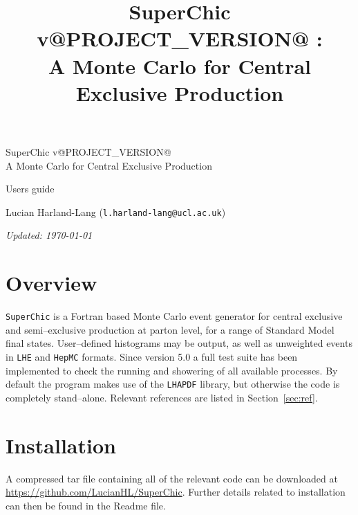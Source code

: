 \documentclass[12pt]{article}
\title{SuperChic v@PROJECT_VERSION@ : \\ \vspace{0.5cm}A Monte Carlo for Central Exclusive Production}
\begin{document}
\begin{titlepage}
\begin{center}

{\huge SuperChic v@PROJECT_VERSION@} \\ \vspace{0.5cm} {\Large A Monte Carlo for Central Exclusive Production}

\vspace{3cm}

{\huge Users guide}

\vspace{3cm}

\large{ Lucian Harland-Lang (\texttt{l.harland-lang@ucl.ac.uk})}

\vspace{3cm}
{\small \emph{Updated: \today}}

\end{center}
\end{titlepage}

\clearpage

\tableofcontents

\clearpage

\section{Overview}

\texttt{SuperChic} is a Fortran based Monte Carlo event 
generator for central exclusive and semi--exclusive production at parton 
level, for a range of Standard Model final states. User--defined 
histograms may be output, as well as unweighted events in 
\texttt{LHE} and \texttt{HepMC} formats. Since version 5.0 a full test suite has been implemented to check the running and showering of all available processes. By default the program makes use of the \texttt{LHAPDF}
library, but otherwise the code is completely stand--alone. Relevant 
references are listed in Section~\ref{sec:ref}.

\section{Installation}

A compressed tar file containing all of the relevant code can be 
downloaded at 
\url{https://github.com/LucianHL/SuperChic}. Further details related to installation can then be found in the Readme file.
\end{document}
